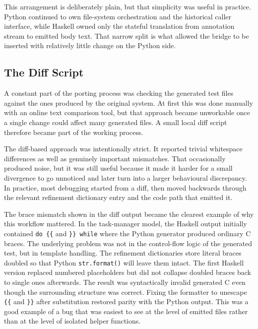 This arrangement is deliberately plain, but that simplicity was useful
in practice. Python continued to own file-system orchestration and the
historical caller interface, while Haskell owned only the stateful
translation from annotation stream to emitted body text. That narrow
split is what allowed the bridge to be inserted with relatively little
change on the Python side.

\subsection{The Diff Script}


A constant part of the porting process was checking the generated test
files against the ones produced by the original system. At first this
was done manually with an online text comparison tool, but that
approach became unworkable once a single change could affect many
generated files. A small local diff script therefore became part of
the working process.


The diff-based approach was intentionally strict. It reported trivial
whitespace differences as well as genuinely important mismatches. That
occasionally produced noise, but it was still useful because it made
it harder for a small divergence to go unnoticed and later turn into a
larger behavioural discrepancy. In practice, most debugging started
from a diff, then moved backwards through the relevant refinement
dictionary entry and the code path that emitted it.

The brace mismatch shown in the diff output became the clearest
example of why this workflow mattered. In the task-manager model, the
Haskell output initially contained \texttt{do \{\{} and
\texttt{\}\} while} where the Python generator produced ordinary C
braces. The underlying problem was not in the control-flow logic of
the generated test, but in template handling. The refinement
dictionaries store literal braces doubled so that Python
\texttt{str.format()} will leave them intact. The first Haskell
version replaced numbered placeholders but did not collapse doubled
braces back to single ones afterwards. The result was syntactically
invalid generated C even though the surrounding structure was correct.
Fixing the formatter to unescape \texttt{\{\{} and \texttt{\}\}}
after substitution restored parity with the Python output. This was a
good example of a bug that was easiest to see at the level of emitted
files rather than at the level of isolated helper functions.

